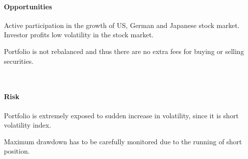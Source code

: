 \documentclass[11pt, parskip=full, DIV=14, headings=small, footsepline, footinclude=false, headsepline]{scrreprt}
\begin{document}
\begin{minipage}[t]{0.49\textwidth}
  \paragraph{Opportunities}
  \begin{sit}
    \item Active participation in the growth of US, German and Japanese stock market. Investor profits low volatility in the stock market.
    \item Portfolio is not rebalanced and thus there are no extra fees for buying or selling securities.
  \end{sit}
\end{minipage}
~~
\begin{minipage}[t]{0.49\textwidth}
  \paragraph{Risk}
  \begin{sit}
    \item Portfolio is extremely exposed to sudden increase in volatility, since it is short volatility index.
    \item Maximum drawdown has to be carefully monitored due to the running of short position.
  \end{sit}
\end{minipage}


\end{document}

